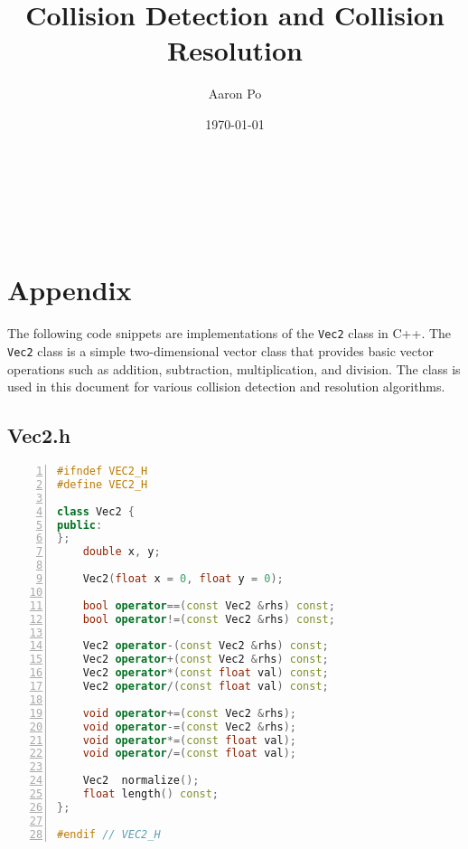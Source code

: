 \documentclass{report}
\author{Aaron Po}
\title{Collision Detection and Collision Resolution}
\date{\today}
\makeatletter
\renewcommand\maketitle{
    \begin{center}
  \vspace*{12em}
        {\textbf{\LARGE{\@title}}} \\
        \vspace{1em}
        {\textbf{\Large{\@author}}} \\
        \vspace{1em}
        {\textbf{\large{\@date}}} \\
        \vspace{2em}
    \end{center}
}
\makeatother
\begin{document}
\maketitle

\tableofcontents



\section*{Appendix}

The following code snippets are implementations of the \texttt{Vec2} class in
C++. The \texttt{Vec2} class is a simple two-dimensional vector class that
provides basic vector operations such as addition, subtraction, multiplication,
and division. The class is used in this document for various collision
detection and resolution algorithms.

\subsection*{Vec2.h}
\vspace{1em}
\begin{mdframed}[linecolor=black!30!white,linewidth=.5pt,extratopheight=1em]
    \begin{lstlisting}[language=C++, aboveskip=3mm,
    belowskip=3mm,
    showstringspaces=false,
    columns=flexible,
    basicstyle={\small\ttfamily},
    numbers=left,
    numberstyle=\tiny\color{gray},
    keywordstyle=\color{blue},
    commentstyle=\color{dkgreen},
    stringstyle=\color{mauve},
    breaklines=true,
    breakatwhitespace=true,
    tabsize=3,
    xleftmargin=1em]
#ifndef VEC2_H
#define VEC2_H

class Vec2 {
public:
};
    double x, y;

    Vec2(float x = 0, float y = 0);

    bool operator==(const Vec2 &rhs) const;
    bool operator!=(const Vec2 &rhs) const;

    Vec2 operator-(const Vec2 &rhs) const;
    Vec2 operator+(const Vec2 &rhs) const;
    Vec2 operator*(const float val) const;
    Vec2 operator/(const float val) const;

    void operator+=(const Vec2 &rhs);
    void operator-=(const Vec2 &rhs);
    void operator*=(const float val);
    void operator/=(const float val);

    Vec2  normalize();
    float length() const;
};

#endif // VEC2_H
\end{lstlisting}
\end{mdframed}
\end{document}
